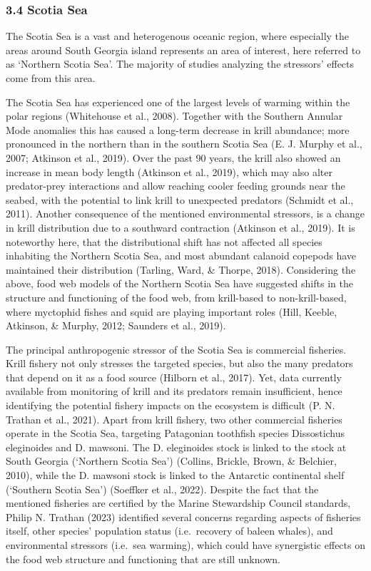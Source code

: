 \documentclass[
]{article}
\begin{document}
\hypertarget{scotia-sea}{%
\subsubsection{3.4 Scotia Sea}\label{scotia-sea}}

The Scotia Sea is a vast and heterogenous oceanic region, where
especially the areas around South Georgia island represents an area of
interest, here referred to as `Northern Scotia Sea'. The majority of
studies analyzing the stressors' effects come from this area.

The Scotia Sea has experienced one of the largest levels of warming
within the polar regions (Whitehouse et al., 2008). Together with the
Southern Annular Mode anomalies this has caused a long-term decrease in
krill abundance; more pronounced in the northern than in the southern
Scotia Sea (E. J. Murphy et al., 2007; Atkinson et al., 2019). Over the
past 90 years, the krill also showed an increase in mean body length
(Atkinson et al., 2019), which may also alter predator-prey interactions
and allow reaching cooler feeding grounds near the seabed, with the
potential to link krill to unexpected predators (Schmidt et al., 2011).
Another consequence of the mentioned environmental stressors, is a
change in krill distribution due to a southward contraction (Atkinson et
al., 2019). It is noteworthy here, that the distributional shift has not
affected all species inhabiting the Northern Scotia Sea, and most
abundant calanoid copepods have maintained their distribution (Tarling,
Ward, \& Thorpe, 2018). Considering the above, food web models of the
Northern Scotia Sea have suggested shifts in the structure and
functioning of the food web, from krill-based to non-krill-based, where
myctophid fishes and squid are playing important roles (Hill, Keeble,
Atkinson, \& Murphy, 2012; Saunders et al., 2019).

The principal anthropogenic stressor of the Scotia Sea is commercial
fisheries. Krill fishery not only stresses the targeted species, but
also the many predators that depend on it as a food source (Hilborn et
al., 2017). Yet, data currently available from monitoring of krill and
its predators remain insufficient, hence identifying the potential
fishery impacts on the ecosystem is difficult (P. N. Trathan et al.,
2021). Apart from krill fishery, two other commercial fisheries operate
in the Scotia Sea, targeting Patagonian toothfish species Dissostichus
eleginoides and D. mawsoni. The D. eleginoides stock is linked to the
stock at South Georgia (`Northern Scotia Sea') (Collins, Brickle, Brown,
\& Belchier, 2010), while the D. mawsoni stock is linked to the
Antarctic continental shelf (`Southern Scotia Sea') (Soeffker et al.,
2022). Despite the fact that the mentioned fisheries are certified by
the Marine Stewardship Council standards, Philip N. Trathan (2023)
identified several concerns regarding aspects of fisheries itself, other
species' population status (i.e.~recovery of baleen whales), and
environmental stressors (i.e.~sea warming), which could have synergistic
effects on the food web structure and functioning that are still
unknown.
\end{document}
